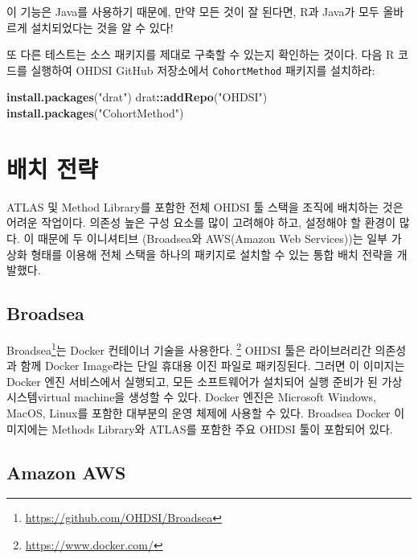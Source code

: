 \documentclass[10.5pt]{book}
\newenvironment{Shaded}{\begin{snugshade}}{\end{snugshade}}
\newcommand{\KeywordTok}[1]{\textcolor[rgb]{0.13,0.29,0.53}{\textbf{#1}}}
\newcommand{\StringTok}[1]{\textcolor[rgb]{0.31,0.60,0.02}{#1}}
\newcommand{\OperatorTok}[1]{\textcolor[rgb]{0.81,0.36,0.00}{\textbf{#1}}}
\newcommand{\NormalTok}[1]{#1}
\let\rmarkdownfootnote\footnote%
\def\footnote{\protect\rmarkdownfootnote}
\theoremstyle{definition}
\theoremstyle{definition}
\theoremstyle{definition}
\theoremstyle{remark}
\begin{document}
이 기능은 Java를 사용하기 때문에, 만약 모든 것이 잘 된다면, R과 Java가
모두 올바르게 설치되었다는 것을 알 수 있다!

또 다른 테스트는 소스 패키지를 제대로 구축할 수 있는지 확인하는 것이다.
다음 R 코드를 실행하여 OHDSI GitHub 저장소에서 \texttt{CohortMethod}
패키지를 설치하라:

\begin{Shaded}
\begin{Highlighting}[]
\KeywordTok{install.packages}\NormalTok{(}\StringTok{"drat"}\NormalTok{)}
\NormalTok{drat}\OperatorTok{::}\KeywordTok{addRepo}\NormalTok{(}\StringTok{"OHDSI"}\NormalTok{)}
\KeywordTok{install.packages}\NormalTok{(}\StringTok{"CohortMethod"}\NormalTok{)}
\end{Highlighting}
\end{Shaded}

\section{배치 전략}\label{-}

ATLAS 및 Method Library를 포함한 전체 OHDSI 툴 스택을 조직에 배치하는
것은 어려운 작업이다. 의존성 높은 구성 요소를 많이 고려해야 하고,
설정해야 할 환경이 많다. 이 때문에 두 이니셔티브 (Broadsea와 AWS(Amazon
Web Services))는 일부 가상화 형태를 이용해 전체 스택을 하나의 패키지로
설치할 수 있는 통합 배치 전략을 개발했다. 

\subsection{Broadsea}\label{broadsea}

Broadsea\footnote{\url{https://github.com/OHDSI/Broadsea}}는 Docker
컨테이너 기술을 사용한다. \footnote{\url{https://www.docker.com/}} OHDSI
툴은 라이브러리간 의존성과 함께 Docker Image라는 단일 휴대용 이진 파일로
패키징된다. 그러면 이 이미지는 Docker 엔진 서비스에서 실행되고, 모든
소프트웨어가 설치되어 실행 준비가 된 가상 시스템virtual machine을 생성할
수 있다. Docker 엔진은 Microsoft Windows, MacOS, Linux를 포함한 대부분의
운영 체제에 사용할 수 있다. Broadsea Docker 이미지에는 Methods Library와
ATLAS를 포함한 주요 OHDSI 툴이 포함되어 있다.

\subsection{Amazon AWS}\label{amazon-aws}
\end{document}
